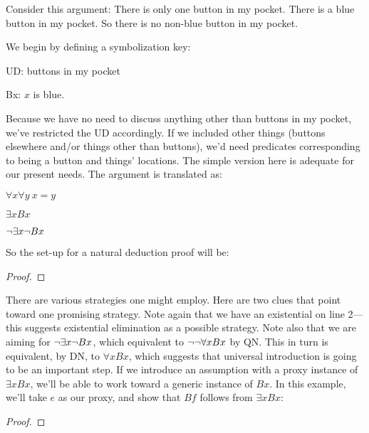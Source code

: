 Consider this argument: There is only one button in my pocket. There is a blue button in my pocket. So there is no non-blue button in my pocket.

We begin by defining a symbolization key:
\begin{ekey}
\item{UD:} buttons in my pocket
\item{Bx:} $x$ is blue.
\end{ekey}
Because we have no need to discuss anything other than buttons in my pocket, we've restricted the UD accordingly. If we included other things (buttons elsewhere and/or things other than buttons), we'd need predicates corresponding to being a button and things' locations. The simple version here is adequate for our present needs. The argument is translated as:
\begin{earg}
\item{} $\forall x \forall y\ x{=}y$
\item{} $\exists x Bx$
\item{\therefore} $\neg \exists x \neg Bx$
\end{earg}

So the set-up for a natural deduction proof will be:

\begin{proof}
	 
	\have{}{}{}
\end{proof}

There are various strategies one might employ. Here are two clues that point toward one promising strategy. Note again that we have an existential on line 2--- this suggests existential elimination as a possible strategy. Note also that we are aiming for $\neg \exists x \neg Bx$, which equivalent to $\neg \neg \forall x Bx$ by QN. This in turn is equivalent, by DN, to $\forall x Bx$, which suggests that universal introduction is going to be an important step. If we introduce an assumption with a proxy instance of $\exists x Bx$, we'll be able to work toward a generic instance of $Bx$. In this example, we'll take $e$ as our proxy, and show that $Bf$ follows from $\exists x Bx$:

\begin{proof}
	 
	\open
	\close
\end{proof}

